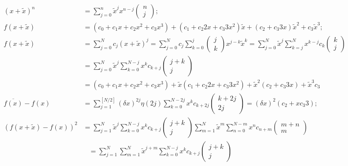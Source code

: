 \documentclass[twoside]{article}
\numberwithin{equation}{section}
\newcommand{\eqspace}{\;\;\;}
\begin{document}
\iffalse

\begin{align*}
(x + \tilde{x})^n &= \sum_{j=0}^{n} \tilde{x}^j x^{n - j}  \begin{pmatrix} n \\ j \end{pmatrix}; \\
f(x + \tilde{x}) &= ( c_0 + c_1 x + c_2 x^2 + c_3 x^3 )  + ( c_1 + c_2 2 x + c_3 3 x^2 ) \tilde{x} +  ( c_2 + c_3 3 x ) \tilde{x}^2 
   + c_3 \tilde{x}^3; \\
f(x + \tilde{x}) &= \sum_{j=0}^{N} c_j (x + \tilde{x})^j 
     = \sum_{j=0}^{N} c_j  \sum_{k=0}^{j} \begin{pmatrix} j \\ k \end{pmatrix} x^{j-k}  \tilde{x}^k
     = \sum_{j=0}^{N} \tilde{x}^{j} \sum_{k=j}^{N} x^{k - j} c_k \begin{pmatrix} k \\ j \end{pmatrix} \\
 & = \sum_{j=0}^{N} \tilde{x}^{j} \sum_{k=0}^{N - j} x^{k} c_{k + j} \begin{pmatrix} j + k \\ j \end{pmatrix} \\   
 &= ( c_0 + c_1 x + c_2 x^2 + c_3 x^3 ) + \tilde{x} (c_1 + c_2 2 x + c_3 3 x^2 ) + \tilde{x}^2 ( c_2 + c_3 3 x ) + \tilde{x}^3 c_3 \\
\overline{f(x)} - f(x) &= \sum_{j=1}^{[N/2]} (\delta x)^{2j} \eta(2j) \sum_{k=0}^{N - 2j} x^{k} c_{k + 2j} \begin{pmatrix} k + 2j \\ 2j \end{pmatrix}
  = (\delta x)^2 ( c_2  + x c_3 3 ); \\
(f(x + \tilde{x}) - f(x))^2 &=
 \sum_{j=1}^{N} \tilde{x}^{j} \sum_{k=0}^{N-j} x^{k} c_{k + j} \begin{pmatrix} j + k \\ j \end{pmatrix} 
 \sum_{m=1}^{N} \tilde{x}^{m} \sum_{n=0}^{N-m} x^{n} c_{n + m} \begin{pmatrix} m + n \\ m \end{pmatrix} \\
    &\eqspace = \sum_{j=1}^{N} \sum_{m=1}^{N} \tilde{x}^{j+m} \sum_{k=0}^{N - j} x^k c_{k+j} \begin{pmatrix} j + k \\ j \end{pmatrix}

\end{align*}
\end{document}
